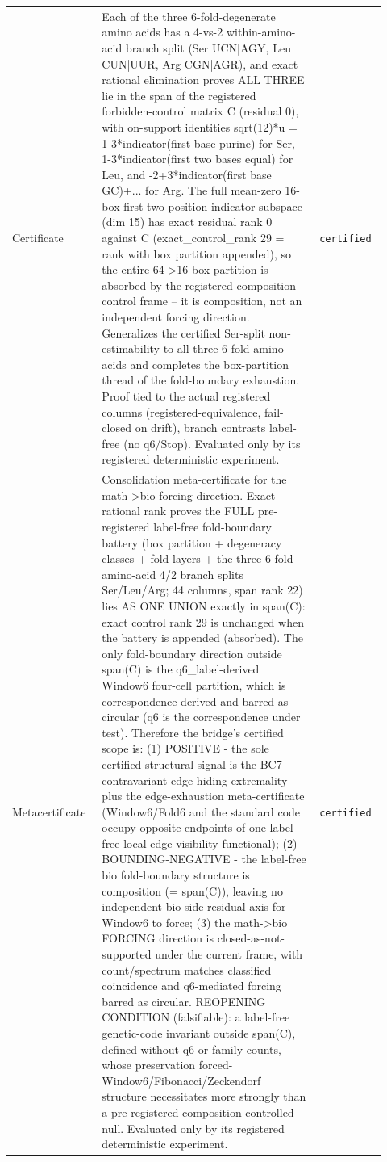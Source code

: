 \begin{longtable}{>{\raggedright\arraybackslash}p{0.22\linewidth}>{\raggedright\arraybackslash}p{0.55\linewidth}>{\raggedright\arraybackslash}p{0.15\linewidth}}
Certificate & Each of the three 6-fold-degenerate amino acids has a 4-vs-2 within-amino-acid branch split (Ser UCN|AGY, Leu CUN|UUR, Arg CGN|AGR), and exact rational elimination proves ALL THREE lie in the span of the registered forbidden-control matrix C (residual 0), with on-support identities sqrt(12)*u = 1-3*indicator(first base purine) for Ser, 1-3*indicator(first two bases equal) for Leu, and -2+3*indicator(first base GC)+... for Arg. The full mean-zero 16-box first-two-position indicator subspace (dim 15) has exact residual rank 0 against C (exact\_control\_rank 29 = rank with box partition appended), so the entire 64->16 box partition is absorbed by the registered composition control frame -- it is composition, not an independent forcing direction. Generalizes the certified Ser-split non-estimability to all three 6-fold amino acids and completes the box-partition thread of the fold-boundary exhaustion. Proof tied to the actual registered columns (registered-equivalence, fail-closed on drift), branch contrasts label-free (no q6/Stop). Evaluated only by its registered deterministic experiment. & \texttt{certified} \\
Metacertificate & Consolidation meta-certificate for the math->bio forcing direction. Exact rational rank proves the FULL pre-registered label-free fold-boundary battery (box partition + degeneracy classes + fold layers + the three 6-fold amino-acid 4/2 branch splits Ser/Leu/Arg; 44 columns, span rank 22) lies AS ONE UNION exactly in span(C): exact control rank 29 is unchanged when the battery is appended (absorbed). The only fold-boundary direction outside span(C) is the q6\_label-derived Window6 four-cell partition, which is correspondence-derived and barred as circular (q6 is the correspondence under test). Therefore the bridge's certified scope is: (1) POSITIVE - the sole certified structural signal is the BC7 contravariant edge-hiding extremality plus the edge-exhaustion meta-certificate (Window6/Fold6 and the standard code occupy opposite endpoints of one label-free local-edge visibility functional); (2) BOUNDING-NEGATIVE - the label-free bio fold-boundary structure is composition (= span(C)), leaving no independent bio-side residual axis for Window6 to force; (3) the math->bio FORCING direction is closed-as-not-supported under the current frame, with count/spectrum matches classified coincidence and q6-mediated forcing barred as circular. REOPENING CONDITION (falsifiable): a label-free genetic-code invariant outside span(C), defined without q6 or family counts, whose preservation forced-Window6/Fibonacci/Zeckendorf structure necessitates more strongly than a pre-registered composition-controlled null. Evaluated only by its registered deterministic experiment. & \texttt{certified} \\

\end{longtable}
